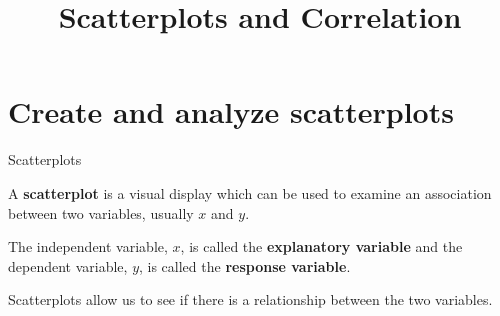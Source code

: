 \documentclass[t]{beamer}
\title{Scatterplots and Correlation}
\author{}
\date{}
\begin{document}
\begin{frame} 
\maketitle
\end{frame}

\section{Create and analyze scatterplots}

\begin{frame}{Scatterplots}
\begin{tcolorbox}[colframe=green!20!black, colback = green!30!white,title=\textbf{Scatterplot}]
A \textbf{scatterplot} is a visual display which can be used to examine an association between two variables, usually $x$ and $y$.
\end{tcolorbox}
\bigskip	\pause

The independent variable, $x$, is called the {\color{blue}\textbf{explanatory variable}} and the dependent variable, $y$, is called the {\color{blue}\textbf{response variable}}.	\bigskip	\pause

Scatterplots allow us to see if there is a relationship between the two variables.
\end{frame}
\end{document}
